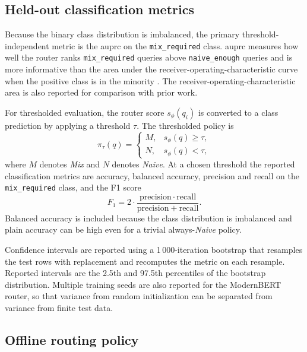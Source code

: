 \documentclass[english, bibtex]{kththesis}               %
\numberwithin{listing}{chapter}
\begin{document}
\subsection{Held-out classification metrics}
\label{sec:methodHeldOut}

Because the binary class distribution is imbalanced, the primary threshold-independent metric is the \gls{auprc} on the \texttt{mix\_required} class. \Gls{auprc} measures how well the router ranks \texttt{mix\_required} queries above \texttt{naive\_enough} queries and is more informative than the area under the receiver-operating-characteristic curve when the positive class is in the minority \cite{saito2015precision}. The receiver-operating-characteristic area is also reported for comparison with prior work.

For thresholded evaluation, the router score \(s_\phi(q_i)\) is converted to a class prediction by applying a threshold \(\tau\). The thresholded policy is
\begin{equation}
\label{eq:routingPolicy}
\pi_\tau(q) =
\begin{cases}
M, & s_\phi(q) \geq \tau,\\
N, & s_\phi(q) < \tau,
\end{cases}
\end{equation}
where \(M\) denotes \emph{Mix} and \(N\) denotes \emph{Naive}. At a chosen threshold the reported classification metrics are accuracy, balanced accuracy, precision and recall on the \texttt{mix\_required} class, and the F1 score
\begin{equation}
\label{eq:f1}
F_1 = 2 \cdot
\frac{\mathrm{precision} \cdot \mathrm{recall}}
     {\mathrm{precision} + \mathrm{recall}}.
\end{equation}
Balanced accuracy is included because the class distribution is imbalanced and plain accuracy can be high even for a trivial always-\emph{Naive} policy.

Confidence intervals are reported using a 1\,000-iteration bootstrap that resamples the test rows with replacement and recomputes the metric on each resample. Reported intervals are the 2.5th and 97.5th percentiles of the bootstrap distribution. Multiple training seeds are also reported for the ModernBERT router, so that variance from random initialization can be separated from variance from finite test data.

\subsection{Offline routing policy}
\label{sec:methodOfflinePolicy}
\end{document}
